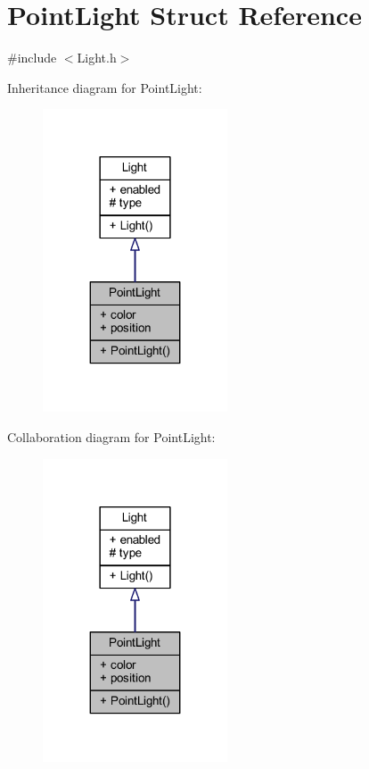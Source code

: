 \hypertarget{struct_point_light}{}\section{Point\+Light Struct Reference}
\label{struct_point_light}


{\ttfamily \#include $<$Light.\+h$>$}



Inheritance diagram for Point\+Light\+:\nopagebreak
\begin{figure}[H]
\begin{center}
\leavevmode
\includegraphics[width=155pt]{struct_point_light__inherit__graph}
\end{center}
\end{figure}


Collaboration diagram for Point\+Light\+:\nopagebreak
\begin{figure}[H]
\begin{center}
\leavevmode
\includegraphics[width=155pt]{struct_point_light__coll__graph}
\end{center}
\end{figure}
